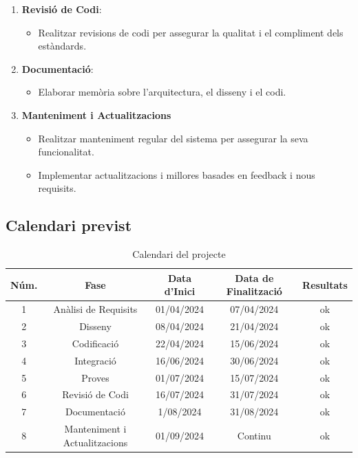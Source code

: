 \documentclass[a4paper,12pt,twoside]{ThesisStyle}
\begin{document}
\begin{enumerate}
  \item \textbf{Revisió de Codi}:
  \begin{itemize}
      \item Realitzar revisions de codi per assegurar la qualitat i el compliment dels estàndards.
  \end{itemize}

  \item \textbf{Documentació}:
  \begin{itemize}
      \item Elaborar memòria sobre l’arquitectura, el disseny i el codi.
  \end{itemize}

  \item \textbf{Manteniment i Actualitzacions}
    \begin{itemize}
        \item Realitzar manteniment regular del sistema per assegurar la seva funcionalitat.
        \item Implementar actualitzacions i millores basades en feedback i nous requisits.
    \end{itemize}


\end{enumerate}


\subsection{Calendari previst}
\label{subsec: Calendari previst}

\begin{table}[h!]
\centering
\begin{tabular}{|c|c|c|c|c|}
\hline
\textbf{Núm.} & \textbf{Fase} & \textbf{Data d'Inici} & \textbf{Data de Finalització} & \textbf{Resultats}\\
\hline
1 & Anàlisi de Requisits & 01/04/2024 & 07/04/2024 & ok \\
2 & Disseny & 08/04/2024 & 21/04/2024 & ok\\
3 & Codificació & 22/04/2024 & 15/06/2024 & ok\\
4 & Integració & 16/06/2024 & 30/06/2024 & ok\\
5 & Proves & 01/07/2024 & 15/07/2024 & ok\\
6 & Revisió de Codi & 16/07/2024 & 31/07/2024 & ok\\
7 & Documentació & 1/08/2024 & 31/08/2024 & ok\\
8 & Manteniment i Actualitzacions & 01/09/2024 & Continu & ok\\
\hline
\end{tabular}
\caption{Calendari del projecte}
\label{tab:calendari}
\end{table}
\end{document}
